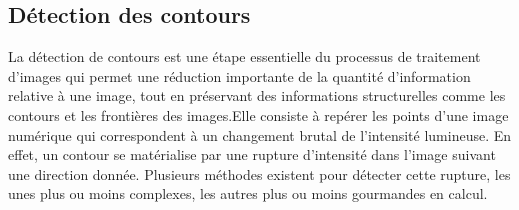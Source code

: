     \subsection{Détection des contours}
    La détection de contours est une étape essentielle du processus de traitement d’images qui permet une réduction importante de la quantité d’information relative à une image, tout en préservant des informations structurelles comme les contours et les frontières des images.Elle consiste à repérer les points d'une image numérique qui correspondent à un
    changement brutal de l'intensité lumineuse. En effet, un contour se matérialise par une rupture d'intensité
    dans l'image suivant une direction donnée. Plusieurs méthodes existent pour détecter cette rupture, les unes plus ou moins complexes, les autres plus ou moins gourmandes en calcul.


